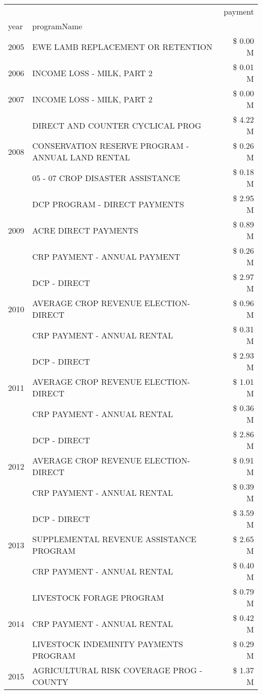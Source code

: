 \begin{tabular}{llr}
\toprule
 &  & payment \\
year & programName &  \\
\midrule
2005 & EWE LAMB REPLACEMENT OR RETENTION & \$ 0.00 M \\
\cline{1-3}
2006 & INCOME LOSS - MILK, PART 2 & \$ 0.01 M \\
\cline{1-3}
2007 & INCOME LOSS - MILK, PART 2 & \$ 0.00 M \\
\cline{1-3}
\multirow[t]{3}{*}{2008} & DIRECT AND COUNTER CYCLICAL PROG & \$ 4.22 M \\
 & CONSERVATION RESERVE PROGRAM - ANNUAL LAND RENTAL & \$ 0.26 M \\
 & 05 - 07 CROP DISASTER ASSISTANCE & \$ 0.18 M \\
\cline{1-3}
\multirow[t]{3}{*}{2009} & DCP PROGRAM - DIRECT PAYMENTS & \$ 2.95 M \\
 & ACRE DIRECT PAYMENTS & \$ 0.89 M \\
 & CRP PAYMENT - ANNUAL PAYMENT & \$ 0.26 M \\
\cline{1-3}
\multirow[t]{3}{*}{2010} & DCP - DIRECT & \$ 2.97 M \\
 & AVERAGE CROP REVENUE ELECTION-DIRECT & \$ 0.96 M \\
 & CRP PAYMENT - ANNUAL RENTAL & \$ 0.31 M \\
\cline{1-3}
\multirow[t]{3}{*}{2011} & DCP - DIRECT & \$ 2.93 M \\
 & AVERAGE CROP REVENUE ELECTION-DIRECT & \$ 1.01 M \\
 & CRP PAYMENT - ANNUAL RENTAL & \$ 0.36 M \\
\cline{1-3}
\multirow[t]{3}{*}{2012} & DCP - DIRECT & \$ 2.86 M \\
 & AVERAGE CROP REVENUE ELECTION-DIRECT & \$ 0.91 M \\
 & CRP PAYMENT - ANNUAL RENTAL & \$ 0.39 M \\
\cline{1-3}
\multirow[t]{3}{*}{2013} & DCP - DIRECT & \$ 3.59 M \\
 & SUPPLEMENTAL REVENUE ASSISTANCE PROGRAM & \$ 2.65 M \\
 & CRP PAYMENT - ANNUAL RENTAL & \$ 0.40 M \\
\cline{1-3}
\multirow[t]{3}{*}{2014} & LIVESTOCK FORAGE PROGRAM & \$ 0.79 M \\
 & CRP PAYMENT - ANNUAL RENTAL & \$ 0.42 M \\
 & LIVESTOCK INDEMINITY PAYMENTS PROGRAM & \$ 0.29 M \\
\cline{1-3}
\multirow[t]{3}{*}{2015} & AGRICULTURAL RISK COVERAGE PROG - COUNTY & \$ 1.37 M \\

\end{tabular}
